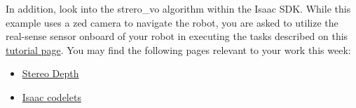 In addition, look into the \textsf{strero\_vo} algorithm within the Isaac SDK. While this example uses a zed camera to navigate the robot, you are asked to utilize the real-sense sensor onboard of your robot in executing the tasks described on this \href{https://docs.nvidia.com/isaac/isaac/packages/perception/doc/visual_odometry.html}{tutorial page}. You may find the following pages relevant to your work this week:

\begin{itemize}
	\item \href{https://docs.nvidia.com/isaac/isaac/packages/stereo_depth/doc/c2f-stereo-depth.html}{Stereo Depth}  %
	\item \href{https://docs.nvidia.com/isaac/isaac/doc/engine/components.html}{Isaac codelets}
\end{itemize}